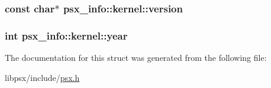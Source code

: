 \subsubsection[{version}]{\setlength{\rightskip}{0pt plus 5cm}const char$\ast$ psx\+\_\+info\+::kernel\+::version}\label{structpsx__info_1_1kernel_adf920bd7e3545f508697900f6da60940}
\hypertarget{structpsx__info_1_1kernel_a347d5fa74908bbc54b31530a0a3e3416}{}
\subsubsection[{year}]{\setlength{\rightskip}{0pt plus 5cm}int psx\+\_\+info\+::kernel\+::year}\label{structpsx__info_1_1kernel_a347d5fa74908bbc54b31530a0a3e3416}


The documentation for this struct was generated from the following file\+:\begin{DoxyCompactItemize}
\item 
libpsx/include/\hyperlink{psx_8h}{psx.\+h}\end{DoxyCompactItemize}
